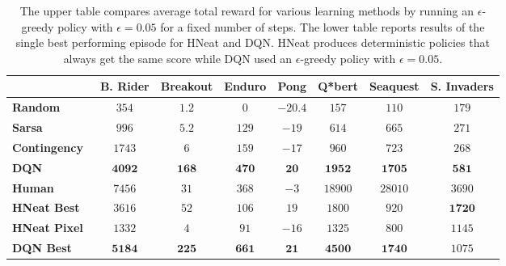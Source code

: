 \documentclass{article} %
\begin{document}
\begin{table}
\begin{center}
\begin{tabular}{ |l | c | c | c | c | c | c | c |}
	\hline
	& {\small \textbf{B. Rider}} & {\small \textbf{Breakout}} & {\small \textbf{Enduro}} & {\small \textbf{Pong}} & {\small \textbf{Q*bert}} & {\small \textbf{Seaquest}} & {\small \textbf{S. Invaders}}\\
	\hline
	{\small \textbf{Random}}                                    & $354$ & $1.2$ & $0$ & $-20.4$ & $157$ & $110$ & $179$ \\
	\hline
	{\small \textbf{Sarsa}~\cite{bellemare-ale}}                & $996$ & $5.2$ & $129$ & $-19$ & $614$ & $665$ & $271$ \\
	\hline
	{\small \textbf{Contingency}~\cite{bellemare-contingency} } & $1743$ & $6$ & $159$ & $-17$ & $960$ & $723$ & $268$ \\
	\hline
	{\small \textbf{DQN} }                                      & $\textbf{4092}$ & $\textbf{168}$ & $\textbf{470}$ & $\textbf{20}$ & $\textbf{1952}$ & $\textbf{1705}$ & $\textbf{581}$ \\
	\hline
	{\small \textbf{Human} }                                    & $7456$ & $31$ & $368$ & $-3$ & $18900$ & $28010$ & $3690$ \\
	\hline
	\hline
	{\small \textbf{HNeat Best} \cite{hausknecht-neuro}}        & $3616$ & $52$ & $106$ & $19$ & $1800$ & $920$ & $\textbf{1720}$ \\
	\hline
	{\small \textbf{HNeat Pixel} \cite{hausknecht-neuro}}       & $1332$ & $4$ & $91$ & $-16$ & $1325$ & $800$ & $1145$ \\
	\hline
	{\small \textbf{DQN Best}}                                  & $\textbf{5184}$ & $\textbf{225}$ & $\textbf{661}$ & $\textbf{21}$ & $\textbf{4500}$ & $\textbf{1740}$ & $1075$ \\
	\hline
\end{tabular}
\caption{\label{table-results} The upper table compares average total reward for various learning methods by running an $\epsilon$-greedy policy with $\epsilon=0.05$ for a fixed number of steps. The lower table reports results of the single best performing episode for HNeat and DQN.  HNeat produces deterministic policies that always get the same score while DQN used an $\epsilon$-greedy policy with $\epsilon=0.05$.}
\end{center}
\end{table}
\end{document}
